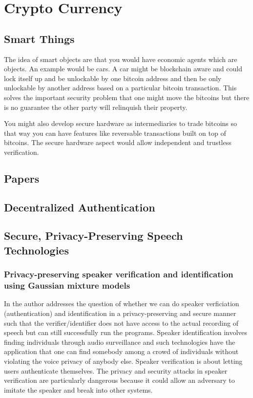 \chapter{Crypto Currency}
\section{Smart Things}
The idea of smart objects are that you would have economic agents which
are objects. An example would be cars. A car might be blockchain aware
and could lock itself up and be unlockable by one bitcoin address
and then be only unlockable by another address based on a particular
bitcoin transaction. This solves the important security problem that one might
move the bitcoins but there is no guarantee the other party will relinquish
their property.

You might also develop secure hardware as intermediaries to trade bitcoins
so that way you can have features like reversable transactions built on
top of bitcoins.  The secure hardware aspect would allow independent and 
trustless verification.

\section{Papers}

\section{Decentralized Authentication}

\section{Secure, Privacy-Preserving Speech Technologies}


\subsection{Privacy-preserving speaker verification and identification using Gaussian mixture models}
In \cite{pathak2013privacy} the author addresses the question of whether we can do speaker verficiation
(authentication) and identification in a privacy-preserving and secure manner such that the 
verifier/identifier does not have access to the actual recording of speech but can still successfully
run the programs.  Speaker identification involves finding individuals through audio surveillance
and such technologies have the application that one can find somebody among a crowd of individuals
without violating the voice privacy of anybody else.  Speaker verification is about letting users
authenticate themselves.  The privacy and security attacks in speaker verification are particularly
dangerous because it could allow an adversary to imitate the speaker and break into other systems.

